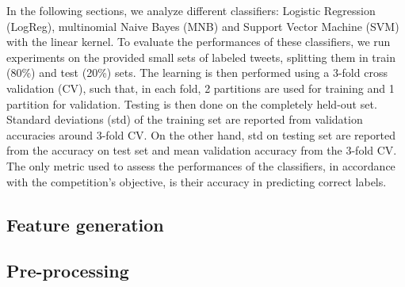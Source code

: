 In the following sections, we analyze different classifiers: Logistic Regression (LogReg), multinomial Naive Bayes (MNB) and Support Vector Machine (SVM) with the linear kernel. 
To evaluate the performances of these classifiers, we run experiments on the provided small sets of labeled tweets, splitting them in train (80\%) and test (20\%) sets. 
The learning is then performed using a 3-fold cross validation (CV), such that, in each fold, 2 partitions are used for training and 1 partition for validation. 
Testing is then done on the completely held-out set. 
Standard deviations (std) of the training set are reported from validation accuracies around 3-fold CV. 
On the other hand, std on testing set are reported from the accuracy on test set and mean validation accuracy from the 3-fold CV. 
The only metric used to assess the performances of the classifiers, in accordance with the competition's objective, is their accuracy in predicting correct labels. 
\subsection{Feature generation}


\subsection{Pre-processing}\label{preproIII}
